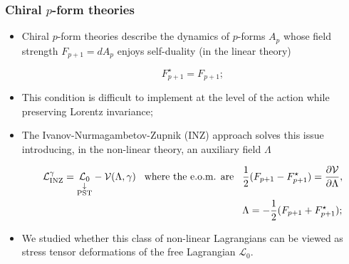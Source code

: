 \documentclass{beamer}
\begin{document}
\begin{frame}
\frametitle{Chiral $p$-form theories}

    \begin{itemize}[<+->]
    \item Chiral $p$-form theories describe the dynamics of $p$-forms $A_{p}$ whose field strength $F_{p+1}=dA_p$ enjoys self-duality (in the linear theory)

    \[F^\star_{p+1}=F_{p+1};\]

    \item This condition is difficult to implement at the level of the action while preserving Lorentz invariance;
    \item The Ivanov-Nurmagambetov-Zupnik (INZ) approach solves this issue introducing, in the non-linear theory, an auxiliary field $\Lambda$

    \[\begin{aligned}
    \mathcal{L}_{\text{INZ}}^\gamma=\underset{\substack{\downarrow\\\text{\scriptsize PST}}}{\mathcal{L}_0}-\mathcal{V}(\Lambda,\gamma)\hspace{0.3cm}\text{where the e.o.m. are}\hspace{0.3cm}&\frac{1}{2}(F_{p+1}-F^\star_{p+1})=\frac{\partial\mathcal{V}}{\partial\Lambda},\\
    &\Lambda=-\frac{1}{2}(F_{p+1}+F^{\star}_{p+1});
    \end{aligned}\]


    \item We studied whether this class of non-linear Lagrangians can be viewed as stress tensor deformations of the free Lagrangian $\mathcal{L}_0$. 
    
    \end{itemize}


\end{frame}
\end{document}
